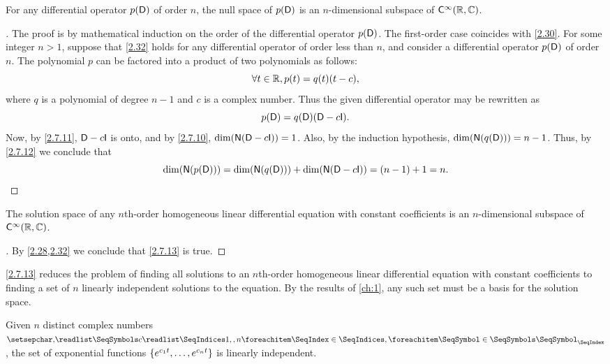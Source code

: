\begin{thm}\label{2.32}
	For any differential operator \(p(\mathsf{D})\) of order \(n\), the null space of \(p(\mathsf{D})\) is an \(n\)-dimensional subspace of \(\cfs[\infty](\R, \C)\).
\end{thm}

\begin{proof}[]
	The proof is by mathematical induction on the order of the differential operator \(p(\mathsf{D})\).
	The first-order case coincides with \cref{2.30}.
	For some integer \(n > 1\), suppose that \cref{2.32} holds for any differential operator of order less than \(n\), and consider a differential operator \(p(\mathsf{D})\) of order \(n\).
	The polynomial \(p\) can be factored into a product of two polynomials as follows:
	\[
		\forall t \in \mathbb{R}, p(t) = q(t) (t - c),
	\]
	where \(q\) is a polynomial of degree \(n - 1\) and \(c\) is a complex number.
	Thus the given differential operator may be rewritten as
	\[
		p(\Dop) = q(\Dop) (\Dop - c \IT).
	\]
	Now, by \cref{2.7.11}, \(\Dop - c \IT\) is onto, and by \cref{2.7.10}, \(\dim(\ns{\Dop - c \IT}) = 1\).
	Also, by the induction hypothesis, \(\dim(\ns{q(\Dop)}) = n - 1\).
	Thus, by \cref{2.7.12} we conclude that
	\[
		\dim(\ns{p(\Dop)}) = \dim(\ns{q(\Dop)}) + \dim(\ns{\Dop - c \IT}) = (n - 1) + 1 = n.
	\]
\end{proof}

\begin{cor}\label{2.7.13}
	The solution space of any \(n\)th-order homogeneous linear differential equation with constant coefficients is an \(n\)-dimensional subspace of \(\cfs[\infty](\R, \C)\).
\end{cor}

\begin{proof}[]
	By \cref{2.28,2.32} we conclude that \cref{2.7.13} is true.
\end{proof}

\begin{note}
	\cref{2.7.13} reduces the problem of finding all solutions to an \(n\)th-order homogeneous linear differential equation with constant coefficients to finding a set of \(n\) linearly independent solutions to the equation.
	By the results of \cref{ch:1}, any such set must be a basis for the solution space.
\end{note}

\begin{thm}\label{2.33}
	Given \(n\) distinct complex numbers \(\seq{c}{1,,n}\), the set of exponential functions \(\left\lbrace e^{c_1 t}, \dots, e^{c_n t}\right\rbrace\) is linearly independent.
\end{thm}

